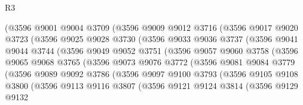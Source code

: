 \begin{lexlean}{R3}
\begin{coremodule}
                (@3596
                  @9001
                  @9004
                  @3709
                  (@3596
                    @9009
                    @9012
                    @3716
                    (@3596
                      @9017
                      @9020
                      @3723
                      (@3596
                        @9025
                        @9028
                        @3730
                        (@3596
                          @9033
                          @9036
                          @3737
                          (@3596
                            @9041
                            @9044
                            @3744
                            (@3596
                              @9049
                              @9052
                              @3751
                              (@3596
                                @9057
                                @9060
                                @3758
                                (@3596
                                  @9065
                                  @9068
                                  @3765
                                  (@3596
                                    @9073
                                    @9076
                                    @3772
                                    (@3596
                                      @9081
                                      @9084
                                      @3779
                                      (@3596
                                        @9089
                                        @9092
                                        @3786
                                        (@3596
                                          @9097
                                          @9100
                                          @3793
                                          (@3596
                                            @9105
                                            @9108
                                            @3800
                                            (@3596
                                              @9113
                                              @9116
                                              @3807
                                              (@3596
                                                @9121
                                                @9124
                                                @3814
                                                (@3596
                                                  @9129
                                                  @9132

\end{coremodule}
\end{lexlean}
